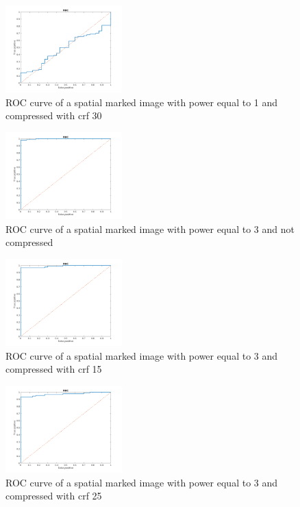 \begin{figure}[h!]
\centering
\includegraphics[width=0.4\textwidth]{./img/ROC/ROC_gauss_1_30.png}
\caption{\small{ROC curve of a spatial marked image with power equal to 1 and compressed with crf 30}}
\label{fig:g1crf30}
\end{figure}
\begin{figure}[h!]
\centering
\includegraphics[width=0.4\textwidth]{./img/ROC/ROC_gauss_3_1.png}
\caption{\small{ROC curve of a spatial marked image with power equal to 3 and not compressed }}
\label{fig:g3crf1}
\end{figure}
\begin{figure}[h!]
\centering
\includegraphics[width=0.4\textwidth]{./img/ROC/ROC_gauss_3_15.png}
\caption{\small{ROC curve of a spatial marked image with power equal to 3 and compressed with crf 15 }}
\label{fig:g3crf15}
\end{figure}
\begin{figure}[h!]
\centering
\includegraphics[width=0.4\textwidth]{./img/ROC/ROC_gauss_3_25.png}
\caption{\small{ROC curve of a spatial marked image with power equal to 3 and compressed with crf 25 }}
\label{fig:g3crf25}
\end{figure}
